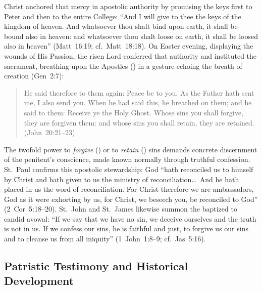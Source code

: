 Christ anchored that mercy in apostolic authority by promising the keys first to Peter and then to the entire College: ``And I will give to thee the keys of the kingdom of heaven. And whatsoever thou shalt bind upon earth, it shall be bound also in heaven: and whatsoever thou shalt loose on earth, it shall be loosed also in heaven'' (Matt~16:19; cf.~Matt~18:18). On Easter evening, displaying the wounds of His Passion, the risen Lord conferred that authority and instituted the sacrament, breathing upon the Apostles () in a gesture echoing the breath of creation (Gen~2:7):
\begin{quotation}
He said therefore to them again: Peace be to you. As the Father hath sent me, I also send you. When he had said this, he breathed on them; and he said to them: Receive ye the Holy Ghost. Whose sins you shall forgive, they are forgiven them: and whose sins you shall retain, they are retained. (John~20:21--23)
\end{quotation}
The twofold power to \emph{forgive} () or to \emph{retain} () sins demands concrete discernment of the penitent's conscience, made known normally through truthful confession. St.~Paul confirms this apostolic stewardship: God ``hath reconciled us to himself by Christ and hath given to us the ministry of reconciliation\ldots\ And he hath placed in us the word of reconciliation. For Christ therefore we are ambassadors, God as it were exhorting by us, for Christ, we beseech you, be reconciled to God'' (2~Cor~5:18--20). St.~John and St.~James likewise summon the baptized to candid avowal: ``If we say that we have no sin, we deceive ourselves and the truth is not in us. If we confess our sins, he is faithful and just, to forgive us our sins and to cleanse us from all iniquity'' (1~John~1:8--9; cf.~Jas~5:16).

\subsection{Patristic Testimony and Historical Development}
\label{subsec:penance-patristics}

